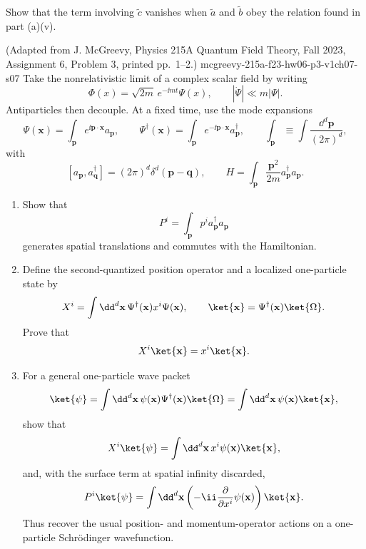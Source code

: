 \begin{enumerate}
\begin{enumerate}
\begin{enumerate}
Show that the term involving \(\widetilde c\) vanishes when
\(\widetilde a\) and \(\widetilde b\) obey the relation found in
part (a)(v).
\end{enumerate}
\end{enumerate}

  {(Adapted from J. McGreevy, Physics 215A Quantum Field Theory, Fall 2023, Assignment 6, Problem 3, printed pp.~1--2.)}
  {mcgreevy-215a-f23-hw06-p3-v1ch07-s07}
Take the nonrelativistic limit of a complex scalar field by writing
\[
 \Phi(x)=\sqrt{2m}\,e^{-\ii mt}\Psi(x),
 \qquad |\dot\Psi|\ll m|\Psi|.
\]
Antiparticles then decouple.  At a fixed time, use the mode expansions
\[
 \Psi(\mathbf x)=\int_{\mathbf p}e^{\ii\mathbf p\cdot\mathbf x}
 a_{\mathbf p},
 \qquad
 \Psi^\dagger(\mathbf x)=\int_{\mathbf p}e^{-\ii\mathbf p\cdot\mathbf x}
 a_{\mathbf p}^\dagger,
 \qquad
 \int_{\mathbf p}\equiv\int\frac{\dd^d\mathbf p}{(2\pi)^d},
\]
with
\[
 [a_{\mathbf p},a_{\mathbf q}^\dagger]
 =(2\pi)^d\delta^d(\mathbf p-\mathbf q),
 \qquad
 H=\int_{\mathbf p}\frac{\mathbf p^2}{2m}
 a_{\mathbf p}^\dagger a_{\mathbf p}.
\]
\begin{enumerate}
\item
Show that
\[
 P^i=\int_{\mathbf p}p^i a_{\mathbf p}^\dagger a_{\mathbf p}
\]
generates spatial translations and commutes with the Hamiltonian.
\item
Define the second-quantized position operator and a localized one-particle
state by
\[
 X^i=\int \dd^d\mathbf x\,
 \Psi^\dagger(\mathbf x)x^i\Psi(\mathbf x),
 \qquad
 \ket{\mathbf x}=\Psi^\dagger(\mathbf x)\ket{\Omega}.
\]
Prove that
\[
 X^i\ket{\mathbf x}=x^i\ket{\mathbf x}.
\]
\item
For a general one-particle wave packet
\[
 \ket{\psi}=\int \dd^d\mathbf x\,
 \psi(\mathbf x)\Psi^\dagger(\mathbf x)\ket{\Omega}
 =\int \dd^d\mathbf x\,\psi(\mathbf x)\ket{\mathbf x},
\]
show that
\[
 X^i\ket{\psi}
 =\int \dd^d\mathbf x\,x^i\psi(\mathbf x)\ket{\mathbf x},
\]
and, with the surface term at spatial infinity discarded,
\[
 P^i\ket{\psi}
 =\int \dd^d\mathbf x\left(-\ii\frac{\partial}{\partial x^i}
 \psi(\mathbf x)\right)\ket{\mathbf x}.
\]
Thus recover the usual position- and momentum-operator actions on a
one-particle Schr\"odinger wavefunction.
\end{enumerate}


\end{enumerate}
